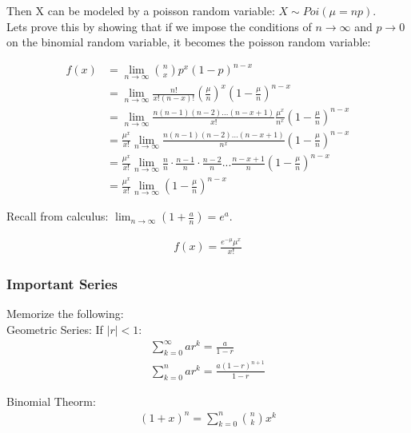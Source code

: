\documentclass[12pt, letterpaper]{article}
\begin{document}
Then X can be modeled by a poisson random variable: \(X \sim Poi(\mu = np)\).\\

Lets prove this by showing that if we impose the conditions of \(n \rightarrow \infty\) and \(p \rightarrow 0\) on the binomial random variable, it becomes the poisson random variable:

\begin{align*}
f\left(x\right) &= \lim_{n \rightarrow \infty} {{n} \choose {x}} p^x (1 - p)^{n - x}\\
&= \lim_{n \rightarrow \infty} \frac{n!}{x!(n - x)!} \left(\frac{\mu}{n}\right)^x \left(1 - \frac{\mu}{n}\right)^{n - x}\\
&= \lim_{n \rightarrow \infty} \frac{n(n - 1)(n - 2)...(n - x + 1)}{x!} \frac{\mu^x}{n^x} \left(1 - \frac{\mu}{n}\right)^{n - x}\\
&= \frac{\mu^x}{x!} \lim_{n \rightarrow \infty} \frac{n(n - 1)(n - 2)...(n - x + 1)}{n^x} \left(1 - \frac{\mu}{n}\right)^{n - x}\\
&= \frac{\mu^x}{x!} \lim_{n \rightarrow \infty} \frac{n}{n} \cdot \frac{n - 1}{n} \cdot \frac{n - 2}{n} ... \frac{n - x + 1}{n} \left(1 - \frac{\mu}{n}\right)^{n - x}\\
&= \frac{\mu^x}{x!} \lim_{n \rightarrow \infty} \left(1 - \frac{\mu}{n}\right)^{n - x}
\end{align*}

Recall from calculus: \(\lim_{n \rightarrow \infty} \left(1 + \frac{a}{n}\right) = e^a\).

\begin{align*}
f\left(x\right) = \frac{e^{-\mu}\mu^x}{x!}
\end{align*}

\subsubsection{Important Series}
Memorize the following:\\

Geometric Series: If \(\vert r \vert < 1\):
\begin{align*}
\sum_{k = 0}^{\infty} ar^k = \frac{a}{1 - r}\\
\sum_{k = 0}^{n} ar^k = \frac{a(1 - r)^{n + 1}}{1 - r}
\end{align*}

Binomial Theorm:
\begin{align*}
(1 + x)^n = \sum_{k = 0}^{n} {{n} \choose {k}} x^k
\end{align*}
\end{document}
